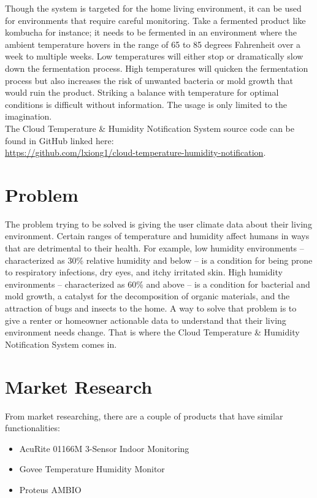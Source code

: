 \documentclass{article}
\begin{document}
Though the system is targeted for the home living environment, it can be used for environments that require careful monitoring. Take a fermented product like kombucha for instance; it needs to be fermented in an environment where the ambient temperature hovers in the range of 65 to 85 degrees Fahrenheit over a week to multiple weeks. Low temperatures will either stop or dramatically slow down the fermentation process. High temperatures will quicken the fermentation process but also increases the risk of unwanted bacteria or mold growth that would ruin the product. Striking a balance with temperature for optimal conditions is difficult without information. The usage is only limited to the imagination.\\

The Cloud Temperature \& Humidity Notification System source code can be found in GitHub linked here: \\\url{https://github.com/lxiong1/cloud-temperature-humidity-notification}.

\section{Problem}
The problem trying to be solved is giving the user climate data about their living environment. Certain ranges of temperature and humidity affect humans in ways that are detrimental to their health. For example, low humidity environments --characterized as 30\% relative humidity and below -- is a condition for being prone to respiratory infections, dry eyes, and itchy irritated skin. High humidity environments -- characterized as 60\% and above -- is a condition for bacterial and mold growth, a catalyst for the decomposition of organic materials, and the attraction of bugs and insects to the home. A way to solve that problem is to give a renter or homeowner actionable data to understand that their living environment needs change. That is where the Cloud Temperature \& Humidity Notification System comes in.

\section{Market Research}
From market researching, there are a couple of products that have similar functionalities:

\begin{itemize}
    \item AcuRite 01166M 3-Sensor Indoor Monitoring
    \item Govee Temperature Humidity Monitor
    \item Proteus AMBIO
\end{itemize}
\end{document}
